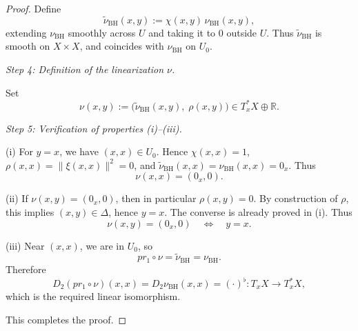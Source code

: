 \documentclass[10pt,a4paper]{amsart}
\begin{document}
\begin{proof}
Define
\[
\widetilde{\nu}_{\mathrm{BH}}(x,y)
:= \chi(x,y)\,\nu_{\mathrm{BH}}(x,y),
\]
extending $\nu_{\mathrm{BH}}$ smoothly across $U$ and taking it to $0$ outside $U$.
Thus $\widetilde{\nu}_{\mathrm{BH}}$ is smooth on $X\times X$, and coincides
with $\nu_{\mathrm{BH}}$ on $U_0$.

\medskip
\noindent
\emph{Step 4: Definition of the linearization $\nu$.}

Set
\[
\nu(x,y)
:= \bigl(\widetilde{\nu}_{\mathrm{BH}}(x,y),\;\rho(x,y)\bigr)
\in T_x^\ast X \oplus \mathbb{R}.
\]

\medskip
\noindent
\emph{Step 5: Verification of properties (i)--(iii).}

(i)  
For $y=x$, we have $(x,x)\in U_0$.
Hence $\chi(x,x)=1$, $\rho(x,x)=\|\xi(x,x)\|^2=0$, and
$\widetilde{\nu}_{\mathrm{BH}}(x,x)=\nu_{\mathrm{BH}}(x,x)=0_x$.
Thus
\[
\nu(x,x)=(0_x,0).
\]

(ii)  
If $\nu(x,y)=(0_x,0)$, then in particular $\rho(x,y)=0$.
By construction of $\rho$, this implies $(x,y)\in\Delta$, hence $y=x$.
The converse is already proved in (i).
Thus
\[
\nu(x,y)=(0_x,0)\quad\Longleftrightarrow\quad y=x.
\]

(iii)  
Near $(x,x)$, we are in $U_0$, so
\[
pr_1\circ \nu = \widetilde{\nu}_{\mathrm{BH}}
                = \nu_{\mathrm{BH}}.
\]
Therefore
\[
D_2(pr_1\circ \nu)(x,x)
= D_2\nu_{\mathrm{BH}}(x,x)
= (\cdot)^\flat : T_xX \to T_x^\ast X,
\]
which is the required linear isomorphism.

\medskip
This completes the proof.
\end{proof}
\end{document}
